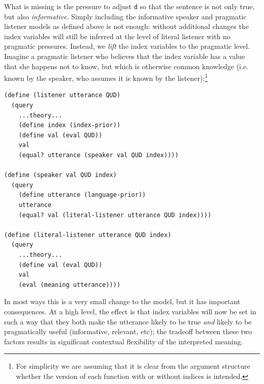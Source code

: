 \documentclass[pdfextras]{handbook}
\begin{document}
What is missing is the pressure to adjust \lstinline{d} so that the sentence is not only true, but also \emph{informative}. 
Simply including the informative speaker and pragmatic listener models as defined above is not enough: without additional changes the index variables will still be inferred at the level of literal listener with no pragmatic pressures. 
Instead, we \emph{lift} the index variables to the pragmatic level. 
Imagine a pragmatic listener who believes that the index variable has a value that she happens not to know, but which is otherwise common knowledge (i.e. known by the speaker, who assumes it is known by the listener):\footnote{For simplicity we are assuming that it is clear from the argument structure whether the version of each function with or without indices is intended.}
\begin{lstlisting}
(define (listener utterance QUD)
  (query
    ...theory...
    (define index (index-prior))
    (define val (eval QUD))
    val
    (equal? utterance (speaker val QUD index))))
    
(define (speaker val QUD index)
  (query
    (define utterance (language-prior))
    utterance
    (equal? val (literal-listener utterance QUD index))))

(define (literal-listener utterance QUD index)
  (query
    ...theory...
    (define val (eval QUD))
    val
    (eval (meaning utterance))))
\end{lstlisting}
In most ways this is a very small change to the model, but it has important consequences. 
At a high level, the effect is that index variables will now be set in such a way that they both make the utterance likely to be true \emph{and} likely to be pragmatically useful (informative, relevant, etc); the tradeoff between these two factors results in significant contextual flexibility of the interpreted meaning. 
\end{document}
